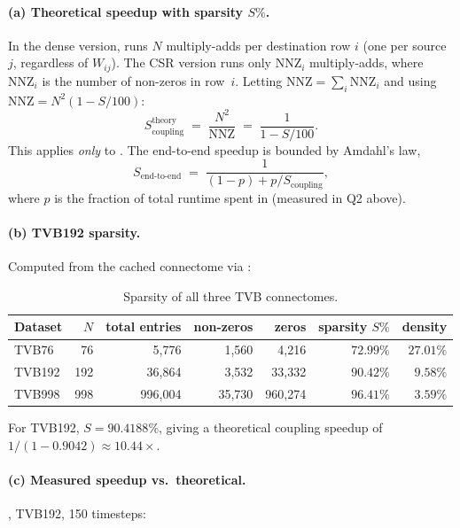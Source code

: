 \documentclass[11pt, a4paper]{article}
\begin{document}
\paragraph{(a) Theoretical speedup with sparsity $S\%$.}
In the dense version,  runs $N$ multiply-adds
per destination row $i$ (one per source $j$, regardless of $W_{ij}$).
The CSR version runs only $\mathrm{NNZ}_i$ multiply-adds, where
$\mathrm{NNZ}_i$ is the number of non-zeros in row~$i$. Letting
$\mathrm{NNZ} = \sum_i \mathrm{NNZ}_i$ and using
$\mathrm{NNZ} = N^2 (1 - S/100)$:
\[
S_{\text{coupling}}^{\text{theory}} \;=\; \frac{N^2}{\mathrm{NNZ}} \;=\; \frac{1}{1 - S/100}.
\]
This applies \emph{only} to . The end-to-end
speedup is bounded by Amdahl's law,
\[
S_{\text{end-to-end}} \;=\; \frac{1}{(1 - p) + p / S_{\text{coupling}}},
\]
where $p$ is the fraction of total runtime spent in
 (measured in Q2 above).

\paragraph{(b) TVB192 sparsity.}
Computed from the cached connectome via :

\begin{table}[H]
    \centering
    \caption{Sparsity of all three TVB connectomes.}
    \label{tab:q4b-sparsity}
    \begin{tabular}{lrrrrrr}
        \toprule
        Dataset & $N$ & total entries & non-zeros & zeros & sparsity $S\%$ & density \\
        \midrule
        TVB76   &  76 &    5{,}776 &  1{,}560 &  4{,}216 & $72.99\%$ & $27.01\%$ \\
        TVB192  & 192 &   36{,}864 &  3{,}532 & 33{,}332 & $\mathbf{90.42\%}$ &  $9.58\%$ \\
        TVB998  & 998 &  996{,}004 & 35{,}730 & 960{,}274 & $96.41\%$ &  $3.59\%$ \\
        \bottomrule
    \end{tabular}
\end{table}

For TVB192, $S = 90.4188\%$, giving a theoretical coupling speedup of
$1 / (1 - 0.9042) \approx \mathbf{10.44\times}$.

\paragraph{(c) Measured speedup vs.\ theoretical.}
, TVB192, 150 timesteps:
\end{document}
